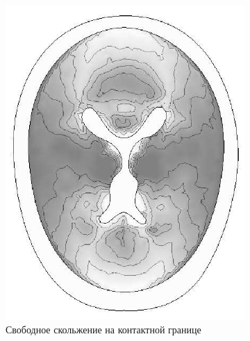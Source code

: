 \begin{figure}[h]
\begin{subfigure}[b]{0.3\textwidth}
\includegraphics[width=\textwidth]{png/cranium/2d-problem-res-5.png}
\caption{Свободное скольжение на контактной границе}
\end{subfigure}
\begin{subfigure}[b]{0.3\textwidth}
\centering

\end{subfigure}
\end{figure}
